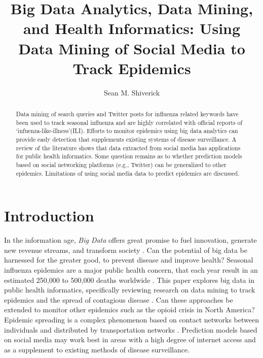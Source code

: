 \documentclass[sigconf]{acmart}
\begin{document}
\title{Big Data Analytics, Data Mining, and Health Informatics: 
Using Data Mining of Social Media to Track Epidemics}
\author{Sean M. Shiverick}

\begin{abstract}

Data mining of search queries and Twitter posts for influenza related keywords have 
been used to track seasonal influenza and are highly correlated with official reports 
of `infuenza-like-illness'(ILI). Efforts to monitor epidemics using big data analytics 
can provide easly detection that supplements existing systems of disease surveillance. 
A review of the literature shows that data extracted from social media has applications 
for public health informatics. Some question remains as to whether prediction models 
based on social networking platforms (e.g., Twitter) can be generalized to other epidemics. 
Limitations of using social media data to predict epidemics are discussed.

\end{abstract}


\maketitle

\section{Introduction}

In the information age, \textit{Big Data} offers great promise to fuel innovation, 
generate new revenue streams, and transform society \cite{gupta15}. Can the 
potential of big data be harnessed for the greater good, to prevent disease 
and improve health? Seasonal influenza epidemics are a major public health concern, 
that each year result in an estimated 250,000 to 500,000 deaths worldwide 
\cite{who17}. This paper explores big data in public health informatics, 
specifically reviewing research on data mining to track epidemics and the spread 
of contagious disease \cite{hay13}. Can these approaches be extended to monitor 
other epidemics such as the opioid crisis in North America? \cite{volkow14}
Epidemic spreading is a complex phenomenon based on contact networks between 
individuals and distributed by transportation networks \cite{Colizza06}. Prediction 
models based on social media may work best in areas with a high degree of internet 
access and as a supplement to existing methods of disease surveillance.  
\end{document}
